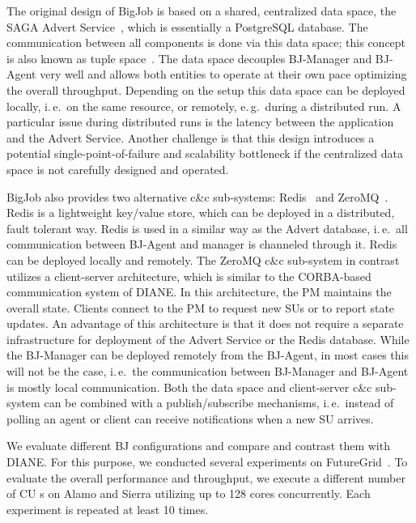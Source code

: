 \documentclass[conference,final]{IEEEtran}
\newcommand{\jhanote}[1]{ {\textcolor{red} { ***shantenu: #1 }}}
\newcommand{\alnote}[1]{ {\textcolor{blue} { ***andre: #1 }}}
\newcommand{\alnote}[1]{}
\newcommand{\jhanote}[1]{}
\newcommand{\cu}{CU\xspace}
\begin{document}
The original design of BigJob is based on a shared, centralized data
space, the SAGA Advert Service~\cite{saga_advert}, which is
essentially a PostgreSQL database. The communication between all
components is done via this data space; this concept is also known as
tuple space~\cite{Gelernter:1985:GCL:2363.2433}.  The data space
decouples BJ-Manager and BJ-Agent very well and allows both entities
to operate at their own pace optimizing the overall throughput.
Depending on the setup this data space can be deployed locally,
i.\,e.\ on the same resource, or remotely, e.\,g.\ during a
distributed run. A particular issue during distributed runs is the
latency between the application and the Advert Service. Another
challenge is that this design introduces a potential
single-point-of-failure and scalability bottleneck if the centralized
data space is not carefully designed and operated.


BigJob also provides two alternative c\&c sub-systems:
Redis~\cite{redis} and ZeroMQ~\cite{zmq}. Redis is a lightweight
key/value store, which can be deployed in a distributed, fault
tolerant way. Redis is used in a similar way as the Advert database,
i.\,e.\ all communication between BJ-Agent and manager is channeled
through it. Redis can be deployed locally and remotely.  The ZeroMQ
c\&c sub-system in contrast utilizes a client-server architecture,
which is similar to the CORBA-based~\cite{OMG-CORBA303:2004}
communication system of DIANE. In this architecture, the PM maintains
the overall state. Clients connect to the PM to request new SUs or to
report state updates. An advantage of this architecture is that it
does not require a separate infrastructure for deployment of the
Advert Service or the Redis database. While the BJ-Manager can be
deployed remotely from the BJ-Agent, in most cases this will not be
the case, i.\,e.\ the communication between BJ-Manager and BJ-Agent is
mostly local communication. Both the data space and client-server c\&c
sub-system can be combined with a publish/subscribe mechanisms,
i.\,e.\ instead of polling an agent or client can receive
notifications when a new SU arrives. 

We evaluate different BJ configurations and compare and contrast them
with DIANE. For this purpose, we conducted several experiments on
FutureGrid~\cite{fg}. To evaluate the overall performance and
throughput, we execute a different number of \cu s on Alamo and Sierra
utilizing up to 128 cores concurrently. Each experiment is repeated at
least 10 times.

\end{document}
